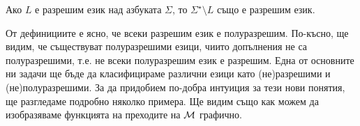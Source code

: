 \begin{framed}
  \begin{proposition}
    Ако $L$ е разрешим език над азбуката $\Sigma$, то $\Sigma^\star \setminus L$ също е разрешим език.
  \end{proposition}
\end{framed}

От дефинициите е ясно, че всеки разрешим език е полуразрешим.
По-късно, ще видим, че съществуват полуразрешими езици, чиито допълнения не са полуразрешими,
т.е. не всеки полуразрешим език е разрешим.
Една от основните ни задачи ще бъде да класифицираме различни езици като (не)раз\-ре\-ши\-ми и (не)полуразрешими.
За да придобием по-добра интуиция за тези нови понятия, ще разгледаме подробно няколко примера.
Ще видим също как можем да изобразяваме функцията на преходите на $\mathcal{M}$ графично.


